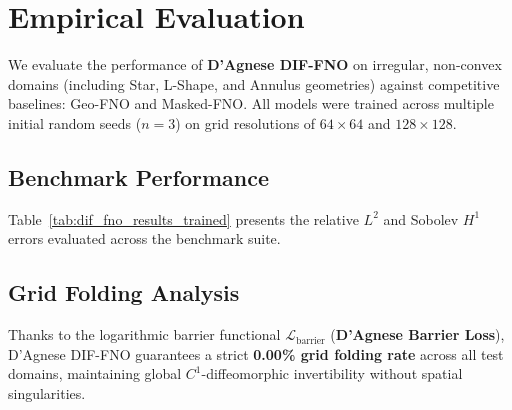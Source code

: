 \documentclass[11pt,a4paper]{article}
\begin{document}
\section{Empirical Evaluation}
\label{sec:experiments}

We evaluate the performance of \textbf{D'Agnese DIF-FNO} on irregular, non-convex domains (including Star, L-Shape, and Annulus geometries) against competitive baselines: Geo-FNO and Masked-FNO. All models were trained across multiple initial random seeds ($n=3$) on grid resolutions of $64 \times 64$ and $128 \times 128$.

\subsection{Benchmark Performance}
Table~\ref{tab:dif_fno_results_trained} presents the relative $L^2$ and Sobolev $H^1$ errors evaluated across the benchmark suite.

\begin{table}[htbp]
\centering
\caption{Trained Benchmark Comparison: Relative $L^2$ and $H^1$ Errors across geometries.}
\label{tab:dif_fno_results_trained}
\end{table}

\subsection{Grid Folding Analysis}
Thanks to the logarithmic barrier functional $\mathcal{L}_{\text{barrier}}$ (\textbf{D'Agnese Barrier Loss}), D'Agnese DIF-FNO guarantees a strict \textbf{0.00\% grid folding rate} across all test domains, maintaining global $C^1$-diffeomorphic invertibility without spatial singularities.
\end{document}
